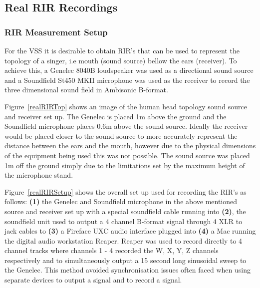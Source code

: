 \documentclass[../../main.tex]{subfiles}
\begin{document}
\subsection{Real RIR Recordings}
\label{realRIRs}
	
	\subsubsection{RIR Measurement Setup}

		For the \ac{VSS} it is desirable to obtain \ac{RIR}'s that can be used to represent the topology of a singer, i.e mouth (sound source) bellow the ears (receiver). To achieve this, a Genelec 8040B \cite{genelec} loudspeaker was used as a directional sound source and a Soundfield St450 MKII microphone \cite{st450} was used as the receiver to record the three dimensional sound field in Ambisonic B-format. 

		Figure~\ref{realRIRTop} shows an image of the human head topology sound source and receiver set up. The Genelec is placed 1m above the ground and the Soundfield microphone places 0.6m above the sound source. Ideally the receiver would be placed closer to the sound source to more accurately represent the distance between the ears and the mouth, however due to the physical dimensions of the equipment being used this was not possible. The sound source was placed 1m off the ground simply due to the limitations set by the maximum height of the microphone stand.

		Figure~\ref{realRIRSetup} shows the overall set up used for recording the \ac{RIR}'s as follows: \textbf{(1)} the Genelec and Soundfield microphone in the above mentioned source and receiver set up with a special soundfield cable running into \textbf{(2)}, the soundfield unit used to output a 4 channel B-format signal through 4 XLR to jack cables to \textbf{(3)} a Fireface UXC audio interface plugged into \textbf{(4)} a Mac running the digital audio workstation Reaper. Reaper was used to record directly to 4 channel tracks where channels 1 - 4 recorded the W, X, Y, Z channels respectively and to simultaneously output a 15 second long sinusoidal sweep to the Genelec. This method avoided synchronisation issues often faced when using separate devices to output a signal and to record a signal.
\end{document}
